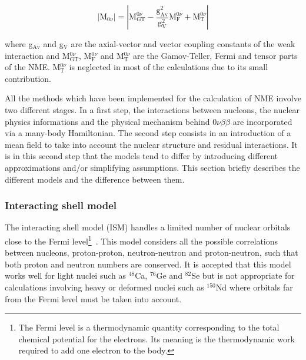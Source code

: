 \documentclass[main.tex]{subfiles}
\begin{document}

\begin{equation}
|\text{M}_{0\nu}| = |\text{M}_{\text{GT}}^{0\nu} - \frac{\text{g}_{\text{Av}}^\text{2}}{\text{g}_\text{V}^\text{2}} \text{M}_\text{F}^{0\nu} + \text{M}_\text{T}^{0\nu}|
\end{equation}


\bigskip


\NI where g$_{\text{Av}}$ and g$_\text{V}$ are the axial-vector and vector coupling constants of the weak interaction and M$_{\text{GT}}^{0\nu}$, M$_{\text{F}}^{0\nu}$ and M$_{\text{T}}^{0\nu}$ are the Gamov-Teller, Fermi and tensor parts of the NME. M$_{\text{T}}^{0\nu}$ is neglected in most of the calculations due to its small contribution.


\bigskip


\NI All the methods which have been implemented for the calculation of NME involve two different stages. In a first step, the interactions between nucleons, the nuclear physics informations and the physical mechanism behind 0$\nu\beta\beta$ are incorporated via a many-body Hamiltonian. The second step consists in an introduction of a mean field to take into account the nuclear structure and residual interactions. It is in this second step that the models tend to differ by introducing different approximations and/or simplifying assumptions. This section briefly describes the different models and the difference between them. %


\subsubsection{Interacting shell model}


\NI The interacting shell model (ISM) handles a limited number of nuclear orbitals close to the Fermi level\footnote{The Fermi level is a thermodynamic quantity corresponding to the total chemical potential for the electrons. Its meaning is the thermodynamic work required to add one electron to the body.}~\cite{ISM_1,ISM_2,ISM_3,ISM_4}. This model considers all the possible correlations between nucleons, proton-proton, neutron-neutron and proton-neutron, such that both proton and neutron numbers are conserved. It is accepted that this model works well for light nuclei such as $^{\text{48}}$Ca, $^{\text{76}}$Ge and $^{\text{82}}$Se but is not appropriate for calculations involving heavy or deformed nuclei such as $^{\text{150}}$Nd where orbitals far from the Fermi level must be taken into account.
\end{document}
